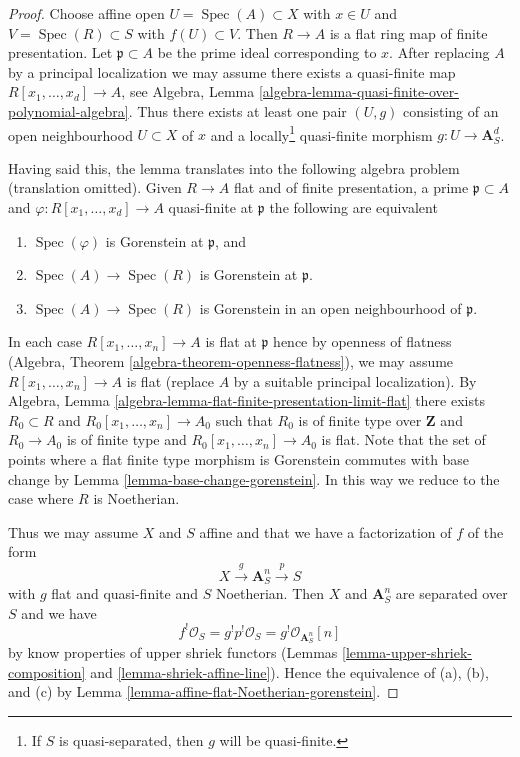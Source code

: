 \documentclass[10pt,a4paper]{amsart}
\theoremstyle{plain}
\theoremstyle{definition}
\theoremstyle{remark}
\numberwithin{equation}{subsection}
\def\Spec{\mathop{\mathrm{Spec}}}
\begin{document}
\begin{proof}
Choose affine open $U = \Spec(A) \subset X$ with $x \in U$ and
$V = \Spec(R) \subset S$ with $f(U) \subset V$. Then $R \to A$
is a flat ring map of finite presentation. Let $\mathfrak p \subset A$
be the prime ideal corresponding to $x$. After replacing $A$ by a
principal localization we may assume there exists a quasi-finite map
$R[x_1, \ldots, x_d]  \to A$, see
Algebra, Lemma \ref{algebra-lemma-quasi-finite-over-polynomial-algebra}.
Thus there exists at least one pair $(U, g)$ consisting of an
open neighbourhood $U \subset X$ of $x$ and a locally\footnote{If $S$
is quasi-separated, then $g$ will be quasi-finite.} quasi-finite morphism
$g : U \to \mathbf{A}^d_S$.

\medskip\noindent
Having said this, the lemma translates into the following algebra
problem (translation omitted). Given $R \to A$ flat and of finite
presentation, a prime $\mathfrak p \subset A$ and
$\varphi : R[x_1, \ldots, x_d] \to A$ quasi-finite at $\mathfrak p$
the following are equivalent
\begin{enumerate}
\item[(a)] $\Spec(\varphi)$ is Gorenstein at $\mathfrak p$, and
\item[(b)] $\Spec(A) \to \Spec(R)$ is Gorenstein at $\mathfrak p$.
\item[(c)] $\Spec(A) \to \Spec(R)$ is Gorenstein in an open neighbourhood
of $\mathfrak p$.
\end{enumerate}
In each case $R[x_1, \ldots, x_n] \to A$ is flat at $\mathfrak p$
hence by openness of flatness
(Algebra, Theorem \ref{algebra-theorem-openness-flatness}),
we may assume $R[x_1, \ldots, x_n] \to A$
is flat (replace $A$ by a suitable principal localization).
By Algebra, Lemma \ref{algebra-lemma-flat-finite-presentation-limit-flat}
there exists $R_0 \subset R$ and $R_0[x_1, \ldots, x_n] \to A_0$
such that $R_0$ is of finite type over $\mathbf{Z}$ and
$R_0 \to A_0$ is of finite type and $R_0[x_1, \ldots, x_n] \to A_0$ is flat.
Note that the set of points where a flat finite type morphism
is Gorenstein commutes with base change by
Lemma \ref{lemma-base-change-gorenstein}.
In this way we reduce to the case where $R$ is Noetherian.

\medskip\noindent
Thus we may assume $X$ and $S$ affine and that
we have a factorization of $f$ of the form
$$
X \xrightarrow{g} \mathbf{A}^n_S \xrightarrow{p} S
$$
with $g$ flat and quasi-finite and $S$ Noetherian. Then $X$ and
$\mathbf{A}^n_S$ are separated over $S$ and we have
$$
f^!\mathcal{O}_S = g^!p^!\mathcal{O}_S = g^!\mathcal{O}_{\mathbf{A}^n_S}[n]
$$
by know properties of upper shriek functors
(Lemmas \ref{lemma-upper-shriek-composition} and
\ref{lemma-shriek-affine-line}).
Hence the equivalence of (a), (b), and (c) by
Lemma \ref{lemma-affine-flat-Noetherian-gorenstein}.
\end{proof}
\end{document}
